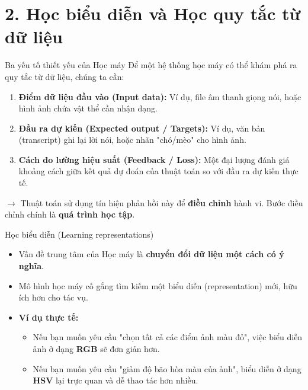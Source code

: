 \documentclass[aspectratio=169]{beamer}
\begin{document}
\section{2. Học biểu diễn và Học quy tắc từ dữ liệu}

\begin{frame}{Ba yếu tố thiết yếu của Học máy}
    Để một hệ thống học máy có thể khám phá ra quy tắc từ dữ liệu, chúng ta cần:
    \begin{enumerate}
        \item \textbf{Điểm dữ liệu đầu vào (Input data):} Ví dụ, file âm thanh giọng nói, hoặc hình ảnh chứa vật thể cần nhận dạng.
        \item \textbf{Đầu ra dự kiến (Expected output / Targets):} Ví dụ, văn bản (transcript) ghi lại lời nói, hoặc nhãn "chó/mèo" cho hình ảnh.
        \item \textbf{Cách đo lường hiệu suất (Feedback / Loss):} Một đại lượng đánh giá khoảng cách giữa kết quả dự đoán của thuật toán so với đầu ra dự kiến thực tế. 
    \end{enumerate}
    $\rightarrow$ Thuật toán sử dụng tín hiệu phản hồi này để \textbf{điều chỉnh} hành vi. Bước điều chỉnh chính là \textbf{quá trình học tập}.
\end{frame}

\begin{frame}{Học biểu diễn (Learning representations)}
    \begin{itemize}
        \item Vấn đề trung tâm của Học máy là \textbf{chuyển đổi dữ liệu một cách có ý nghĩa}.
        \item Mô hình học máy cố gắng tìm kiếm một biểu diễn (representation) mới, hữu ích hơn cho tác vụ.
        \item \textbf{Ví dụ thực tế:}
        \begin{itemize}
            \item Nếu bạn muốn yêu cầu "chọn tất cả các điểm ảnh màu đỏ", việc biểu diễn ảnh ở dạng \textbf{RGB} sẽ đơn giản hơn.
            \item Nếu bạn muốn yêu cầu "giảm độ bão hòa màu của ảnh", biểu diễn ở dạng \textbf{HSV} lại trực quan và dễ thao tác hơn nhiều.
        \end{itemize}
    \end{itemize}
\end{frame}
\end{document}
